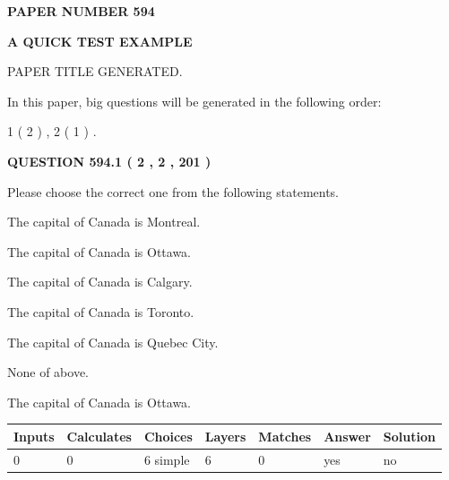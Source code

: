 \documentclass[12pt]{article}
\begin{document}
   
   
   
 {\textbf{ \Large{ PAPER NUMBER  594  }}}
   
   
\vspace{0.2in}
   
   
   
   
   
   
   
   
 \vspace{0.2in}
{\LARGE {\textbf{ A QUICK TEST EXAMPLE}}}
   
   
 PAPER TITLE GENERATED.
   
   
   
\vspace{0.2in}
   
In this paper, big questions will be generated in the following order: 
   
   
   1 ( 2 )
 ,
   2 ( 1 )
 .
  
\vspace{0.2in}
  
{\textbf{\Large{QUESTION
594.1 
 ( 2 , 2 , 201 )
}}}
  
  
Please choose the correct one from the following statements.
 
 
The capital of Canada is Montreal.
 
 
The capital of Canada is Ottawa.
 
 
The capital of Canada is Calgary.
 
 
The capital of Canada is Toronto.
 
 
The capital of Canada is Quebec City.
 
 
 None of above.
 
 
\noindent{}
 
 
The capital of Canada is Ottawa.
 
 
\noindent{}
 
 
   
   
   
   
\noindent\begin{tabular}{|l|l|l|l|l|l|l|}
 \hline
Inputs & Calculates & Choices & Layers & Matches & Answer & Solution \\ \hline
 0  & 
 0  & 
 6
  simple  
  & 
 6  & 
 0  & 
  yes & 
  no 
  \\ \hline
 \end{tabular}
   
\end{document}
